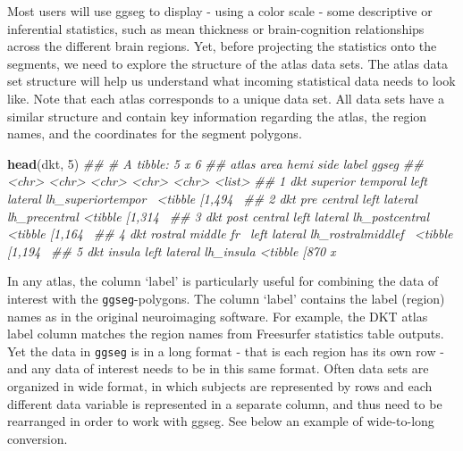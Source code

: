 \documentclass[fleqn,10pt]{wlpeerj} %
\newenvironment{Shaded}{\begin{snugshade}}{\end{snugshade}}
\newcommand{\CommentTok}[1]{\textcolor[rgb]{0.56,0.35,0.01}{\textit{#1}}}
\newcommand{\DecValTok}[1]{\textcolor[rgb]{0.00,0.00,0.81}{#1}}
\newcommand{\KeywordTok}[1]{\textcolor[rgb]{0.13,0.29,0.53}{\textbf{#1}}}
\newcommand{\NormalTok}[1]{#1}
\begin{document}
Most users will use ggseg to display - using a color scale - some descriptive or inferential statistics, such as mean thickness or brain-cognition relationships across the different brain regions.
Yet, before projecting the statistics onto the segments, we need to explore the structure of the atlas data sets.
The atlas data set structure will help us understand what incoming statistical data needs to look like.
Note that each atlas corresponds to a unique data set.
All data sets have a similar structure and contain key information regarding the atlas, the region names, and the coordinates for the segment polygons.

\small

\begin{Shaded}
\begin{Highlighting}[]
\KeywordTok{head}\NormalTok{(dkt, }\DecValTok{5}\NormalTok{)}
\CommentTok{## # A tibble: 5 x 6}
\CommentTok{##   atlas area               hemi  side    label              ggseg          }
\CommentTok{##   <chr> <chr>              <chr> <chr>   <chr>              <list>         }
\CommentTok{## 1 dkt   superior temporal  left  lateral lh_superiortempor~ <tibble [1,494~}
\CommentTok{## 2 dkt   pre central        left  lateral lh_precentral      <tibble [1,314~}
\CommentTok{## 3 dkt   post central       left  lateral lh_postcentral     <tibble [1,164~}
\CommentTok{## 4 dkt   rostral middle fr~ left  lateral lh_rostralmiddlef~ <tibble [1,194~}
\CommentTok{## 5 dkt   insula             left  lateral lh_insula          <tibble [870 x~}
\end{Highlighting}
\end{Shaded}

\normalsize

In any atlas, the column `label' is particularly useful for combining the data of interest with the \texttt{ggseg}-polygons.
The column `label' contains the label (region) names as in the original neuroimaging software.
For example, the DKT atlas label column matches the region names from Freesurfer statistics table outputs.
Yet the data in \texttt{ggseg} is in a long format - that is each region has its own row - and any data of interest needs to be in this same format.
Often data sets are organized in wide format, in which subjects are represented by rows and each different data variable is represented in a separate column, and thus need to be rearranged in order to work with ggseg.
See below an example of wide-to-long conversion.
\end{document}
